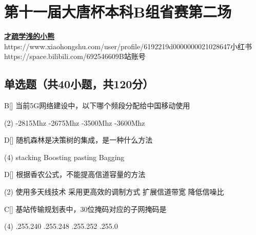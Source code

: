 \chapter{第十一届大唐杯本科B组省赛第二场}
\fancyhead[R]{\color{H6}\kaishu\rightmark\,}

\date{2024年4月20日}{}{\href{https://github.com/xubenshan/dtcup}{\textbf{才疏学浅的小熊}}}
{}
{https://www.xiaohongshu.com/user/profile/6192219d0000000021028647}{小红书}
{https://space.bilibili.com/692546609}{B站账号}



\section{单选题（共40小题，共120分）}



\begin{choice}{B}[]
    当前5G网络建设中，以下哪个频段分配给中国移动使用
    \begin{tasks}(2)
        -2815Mhz
        -2675Mhz
        -3500Mhz
        -3600Mhz
    \end{tasks}
\end{choice}


\begin{choice}{D}[]
    随机森林是决策树的集成，是一种什么方法
    \begin{tasks}(4)
        \task stacking
        \task Boosting
        \task pasting
        \task Bagging
    \end{tasks}
\end{choice}




\begin{choice}{D}[]
    根据香农公式，不能提高信道容量的方法
    \begin{tasks}(2)
        \task 使用多天线技术
        \task 采用更高效的调制方式
        \task 扩展信道带宽
        \task 降低信噪比
    \end{tasks}
\end{choice}



\begin{choice}{C}[]
    基站传输规划表中，30位掩码对应的子网掩码是
    \begin{tasks}(4)
        .255.240
        .255.248
        .255.252
        .255.0
    \end{tasks}
\end{choice}


